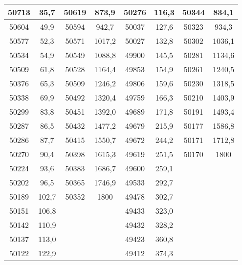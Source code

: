 \documentclass[11pt]{article}
\begin{document}
{{\begin{tabular}{|c|c|c|c|c|c|c|c|}
            50713 & 35,7 & \multicolumn{1}{c|}{50619} & 873,9 & 50276 & 116,3 & \multicolumn{1}{c|}{50344} & \multicolumn{1}{c|}{834,1}\tabularnewline
            \hline 
            50604 & 49,9 & \multicolumn{1}{c|}{50594} & 942,7 & 50037 & 127,6 & \multicolumn{1}{c|}{50323} & \multicolumn{1}{c|}{934,3}\tabularnewline
            \hline 
            50577 & 52,3 & \multicolumn{1}{c|}{50571} & 1017,2 & 50027 & 132,8 & \multicolumn{1}{c|}{50302} & \multicolumn{1}{c|}{1036,1}\tabularnewline
            \hline 
            50534 & 54,9 & \multicolumn{1}{c|}{50549} & 1088,8 & 49900 & 145,5 & \multicolumn{1}{c|}{50281} & \multicolumn{1}{c|}{1134,6}\tabularnewline
            \hline 
            50509 & 61,8 & \multicolumn{1}{c|}{50528} & 1164,4 & 49853 & 154,9 & \multicolumn{1}{c|}{50261} & \multicolumn{1}{c|}{1240,5}\tabularnewline
            \hline 
            50376 & 65,3 & \multicolumn{1}{c|}{50509} & 1246,2 & 49806 & 159,6 & \multicolumn{1}{c|}{50230} & \multicolumn{1}{c|}{1318,5}\tabularnewline
            \hline 
            50338 & 69,9 & \multicolumn{1}{c|}{50492} & 1320,4 & 49759 & 166,3 & \multicolumn{1}{c|}{50210} & \multicolumn{1}{c|}{1403,9}\tabularnewline
            \hline 
            50299 & 83,8 & \multicolumn{1}{c|}{50451} & 1392,0 & 49689 & 171,8 & \multicolumn{1}{c|}{50191} & \multicolumn{1}{c|}{1493,4}\tabularnewline
            \hline 
            50287 & 86,5 & \multicolumn{1}{c|}{50432} & 1477,2 & 49679 & 215,9 & \multicolumn{1}{c|}{50177} & \multicolumn{1}{c|}{1586,8}\tabularnewline
            \hline 
            50286 & 87,7 & \multicolumn{1}{c|}{50415} & 1550,7 & 49672 & 244,2 & \multicolumn{1}{c|}{50171} & \multicolumn{1}{c|}{1712,8}\tabularnewline
            \hline 
            50270 & 90,4 & \multicolumn{1}{c|}{50398} & 1615,3 & 49619 & 251,5 & \multicolumn{1}{c|}{50170} & \multicolumn{1}{c|}{1800}\tabularnewline
            \hline 
            50224 & 93,6 & \multicolumn{1}{c|}{50383} & 1686,7 & 49600 & 259,1 &  & \tabularnewline
            \cline{1-6} 
            50202 & 96,5 & \multicolumn{1}{c|}{50365} & 1746,9 & 49533 & 292,7 &  & \tabularnewline
            \cline{1-6} 
            50189 & 102,7 & \multicolumn{1}{c|}{50352} & 1800 & 49478 & 302,7 &  & \tabularnewline
            \cline{1-6} 
            50151 & 106,8 &  &  & 49433 & 323,0 &  & \tabularnewline
            \cline{1-2} \cline{5-6} 
            50142 & 110,9 &  &  & 49432 & 328,2 &  & \tabularnewline
            \cline{1-2} \cline{5-6} 
            50137 & 113,0 &  &  & 49423 & 360,8 &  & \tabularnewline
            \cline{1-2} \cline{5-6} 
            50122 & 122,9 &  &  & 49412 & 374,3 &  & \tabularnewline

\end{tabular}}}
\end{document}
